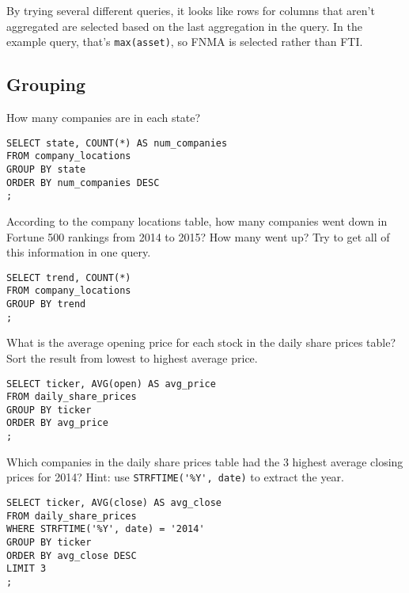 \documentclass[10pt]{exam}
\begin{document}
\begin{questions}
\begin{solution}
By trying several different queries, it looks like rows for columns that aren't
aggregated are selected based on the last aggregation in the query. In the
example query, that's \lstinline{max(asset)}, so FNMA is selected rather than
FTI.
\end{solution}



\subsection*{Grouping}

\question How many companies are in each state?

\begin{solution}
\begin{lstlisting}
SELECT state, COUNT(*) AS num_companies
FROM company_locations
GROUP BY state
ORDER BY num_companies DESC
;
\end{lstlisting}
\end{solution}


\question According to the company locations table, how many companies went
down in Fortune 500 rankings from 2014 to 2015? How many went up? Try to get
all of this information in one query.

\begin{solution}
\begin{lstlisting}
SELECT trend, COUNT(*)
FROM company_locations
GROUP BY trend
;
\end{lstlisting}
\end{solution}


\question What is the average opening price for each stock in the daily share
prices table? Sort the result from lowest to highest average price.

\begin{solution}
\begin{lstlisting}
SELECT ticker, AVG(open) AS avg_price
FROM daily_share_prices
GROUP BY ticker
ORDER BY avg_price
;
\end{lstlisting}
\end{solution}


\question Which companies in the daily share prices table had the 3 highest
average closing prices for 2014? Hint: use \lstinline{STRFTIME('%Y', date)} to
extract the year.

\begin{solution}
\begin{lstlisting}
SELECT ticker, AVG(close) AS avg_close
FROM daily_share_prices
WHERE STRFTIME('%Y', date) = '2014'
GROUP BY ticker
ORDER BY avg_close DESC
LIMIT 3
;
\end{lstlisting}
\end{solution}




\end{questions}
\end{document}
